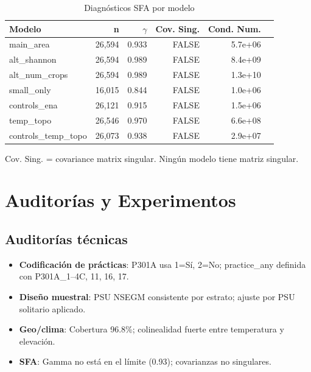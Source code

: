 \documentclass[11pt,a4paper]{article}
\begin{document}
\begin{table}[H]
\centering
\caption{Diagnósticos SFA por modelo}
\label{tab:sfa_diagnostics}
\begin{threeparttable}
\small
\begin{tabular}{lrrrrr}
\toprule
\textbf{Modelo} & \textbf{n} & \textbf{$\gamma$} & \textbf{Cov. Sing.} & \textbf{Cond. Num.} \\
\midrule
main\_area & 26,594 & 0.933 & FALSE & 5.7e+06 \\
alt\_shannon & 26,594 & 0.989 & FALSE & 8.4e+09 \\
alt\_num\_crops & 26,594 & 0.989 & FALSE & 1.3e+10 \\
small\_only & 16,015 & 0.844 & FALSE & 1.0e+06 \\
controls\_ena & 26,121 & 0.915 & FALSE & 1.5e+06 \\
temp\_topo & 26,546 & 0.970 & FALSE & 6.6e+08 \\
controls\_temp\_topo & 26,073 & 0.938 & FALSE & 2.9e+07 \\
\bottomrule
\end{tabular}
\begin{tablenotes}
\footnotesize
\item Cov. Sing. = covariance matrix singular. Ningún modelo tiene matriz singular.
\end{tablenotes}
\end{threeparttable}
\end{table}

\section{Auditorías y Experimentos}

\subsection{Auditorías técnicas}
\begin{itemize}
    \item \textbf{Codificación de prácticas}: P301A usa 1=Sí, 2=No; practice\_any definida con P301A\_1--4C, 11, 16, 17.
    \item \textbf{Diseño muestral}: PSU NSEGM consistente por estrato; ajuste por PSU solitario aplicado.
    \item \textbf{Geo/clima}: Cobertura 96.8\%; colinealidad fuerte entre temperatura y elevación.
    \item \textbf{SFA}: Gamma no está en el límite (0.93); covarianzas no singulares.
\end{itemize}
\end{document}

